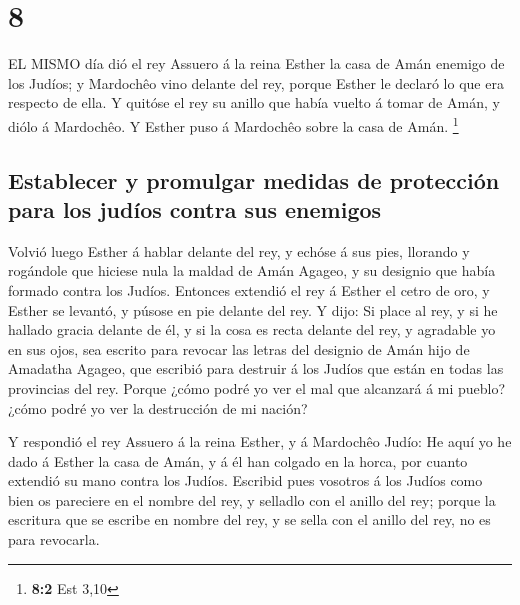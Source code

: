 \hypertarget{section-7}{%
\section{8}\label{section-7}}

 EL MISMO día dió el rey Assuero á la reina Esther la casa
de Amán enemigo de los Judíos; y Mardochêo vino delante del rey, porque
Esther le declaró lo que era respecto de ella.  Y quitóse el
rey su anillo que había vuelto á tomar de Amán, y diólo á Mardochêo. Y
Esther puso á Mardochêo sobre la casa de Amán. \footnote{\textbf{8:2}
  Est 3,10}

\hypertarget{establecer-y-promulgar-medidas-de-protecciuxf3n-para-los-juduxedos-contra-sus-enemigos}{%
\subsection{Establecer y promulgar medidas de protección para los judíos
contra sus
enemigos}\label{establecer-y-promulgar-medidas-de-protecciuxf3n-para-los-juduxedos-contra-sus-enemigos}}

 Volvió luego Esther á hablar delante del rey, y echóse á
sus pies, llorando y rogándole que hiciese nula la maldad de Amán
Agageo, y su designio que había formado contra los Judíos. 
Entonces extendió el rey á Esther el cetro de oro, y Esther se levantó,
y púsose en pie delante del rey.  Y dijo: Si place al rey, y
si he hallado gracia delante de él, y si la cosa es recta delante del
rey, y agradable yo en sus ojos, sea escrito para revocar las letras del
designio de Amán hijo de Amadatha Agageo, que escribió para destruir á
los Judíos que están en todas las provincias del rey. 
Porque ¿cómo podré yo ver el mal que alcanzará á mi pueblo? ¿cómo podré
yo ver la destrucción de mi nación?

 Y respondió el rey Assuero á la reina Esther, y á Mardochêo
Judío: He aquí yo he dado á Esther la casa de Amán, y á él han colgado
en la horca, por cuanto extendió su mano contra los Judíos. 
Escribid pues vosotros á los Judíos como bien os pareciere en el nombre
del rey, y selladlo con el anillo del rey; porque la escritura que se
escribe en nombre del rey, y se sella con el anillo del rey, no es para
revocarla.

